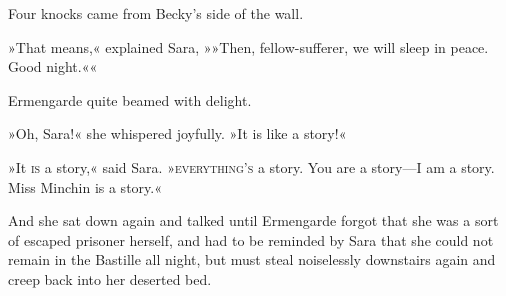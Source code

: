 Four knocks came from Becky's side of the wall.

»That means,« explained Sara, »»Then, fellow-sufferer, we will sleep in peace. Good night.««

Ermengarde quite beamed with delight.

»Oh, Sara!« she whispered joyfully. »It is like a story!«

»It \textsc{is} a story,« said Sara. »\textsc{everything's} a story. You are a story—I am a story. Miss Minchin is a story.«

And she sat down again and talked until Ermengarde forgot that she was a sort of escaped prisoner herself, and had to be reminded by Sara that she could not remain in the Bastille all night, but must steal noiselessly downstairs again and creep back into her deserted bed.